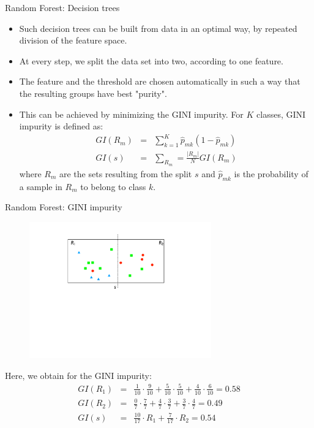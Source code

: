 \documentclass[xcolor=pdftex,dvipsnames,table]{beamer}
\begin{document}
\begin{frame}{Random Forest: Decision trees}
\begin{itemize}
\item Such decision trees can be built from data in an optimal way, by repeated division of the feature space.
\item At every step, we split the data set into two, according to one feature.
\item The feature and the threshold are chosen automatically in such a way that the resulting groups have best "purity".
\item This can be achieved by minimizing the GINI impurity. For $K$ classes, GINI impurity is defined as:
\begin{eqnarray*}
GI(R_m) &=& \sum_{k=1}^{K}\hat{p}_{mk}(1-\hat{p}_{mk}) \\
GI(s) &=& \sum_{R_m}=\frac{|R_m|}{N}GI(R_m)
\end{eqnarray*}
where $R_m$ are the sets resulting from the split $s$ and $\hat{p}_{mk}$ is the probability of a sample in $R_m$ to belong to class $k$.
\end{itemize}
\end{frame}

\begin{frame}{Random Forest: GINI impurity}
\begin{figure}[htb]
\includegraphics[width=0.7\textwidth]{../graphics/RF_GINI.pdf}
\end{figure}
Here, we obtain for the GINI impurity:
\begin{eqnarray*}
GI(R_1) &=&  \frac{1}{10} \cdot \frac{9}{10} + \frac{5}{10} \cdot \frac{5}{10} + \frac{4}{10} \cdot \frac{6}{10} = 0.58 \\
GI(R_2) &=&  \frac{0}{7}\cdot \frac{7}{7} + \frac{4}{7} \cdot \frac{3}{7} + \frac{3}{7} \cdot \frac{4}{7} = 0.49 \\
GI(s) &=&  \frac{10}{17}\cdot R_1 + \frac{7}{17}\cdot R_2 = 0.54
\end{eqnarray*}
\end{frame}
\end{document}
